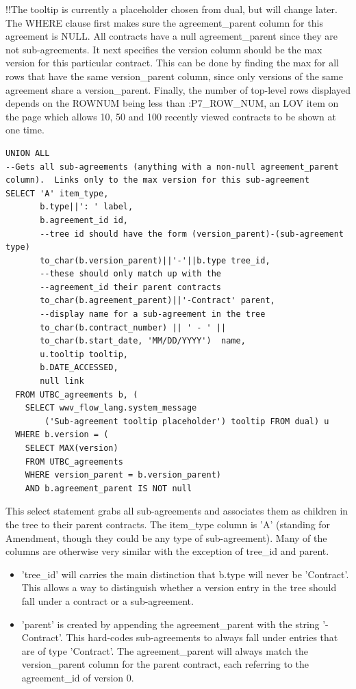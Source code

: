 \documentclass{report}
\begin{document}
!!The tooltip is currently a placeholder chosen from dual, but will change later.
The WHERE clause first makes sure the agreement\_parent column for this agreement is NULL.  All contracts have a null agreement\_parent since they are not sub-agreements.  It next specifies the version column should be the max version for this particular contract.  This can be done by finding the max for all rows that have the same version\_parent column, since only versions of the same agreement share a version\_parent.  Finally, the number of top-level rows displayed depends on the ROWNUM being less than :P7\_ROW\_NUM, an LOV item on the page which allows 10, 50 and 100 recently viewed contracts to be shown at one time.

\begin{lstlisting}[caption=Select statement grabbing all sub-agreements and piling them under their parent contracts.]
UNION ALL
--Gets all sub-agreements (anything with a non-null agreement_parent column).  Links only to the max version for this sub-agreement
SELECT 'A' item_type,
       b.type||': ' label,
       b.agreement_id id,
       --tree id should have the form (version_parent)-(sub-agreement type)
       to_char(b.version_parent)||'-'||b.type tree_id,
       --these should only match up with the 
       --agreement_id their parent contracts
       to_char(b.agreement_parent)||'-Contract' parent,
       --display name for a sub-agreement in the tree
       to_char(b.contract_number) || ' - ' || 
       to_char(b.start_date, 'MM/DD/YYYY')  name,
       u.tooltip tooltip,
       b.DATE_ACCESSED,
       null link
  FROM UTBC_agreements b, (
  	SELECT wwv_flow_lang.system_message
		('Sub-agreement tooltip placeholder') tooltip FROM dual) u
  WHERE b.version = (
  	SELECT MAX(version) 
	FROM UTBC_agreements 
	WHERE version_parent = b.version_parent) 
	AND b.agreement_parent IS NOT null
\end{lstlisting}
This select statement grabs all sub-agreements and associates them as children in the tree to their parent contracts.  The item\_type column is 'A' (standing for Amendment, though they could be any type of sub-agreement).  Many of the columns are otherwise very similar with the exception of tree\_id and parent.

\begin{itemize}
	\item 'tree\_id' will carries the main distinction that b.type will never be 'Contract'.  This allows a way to distinguish whether a version entry in the tree should fall under a contract or a sub-agreement.
	\item 'parent' is created by appending the agreement\_parent with the string '-Contract'.  This hard-codes sub-agreements to always fall under entries that are of type 'Contract'.  The agreement\_parent will always match the version\_parent column for the parent contract, each referring to the agreement\_id of version 0.
\end{itemize}
\end{document}
